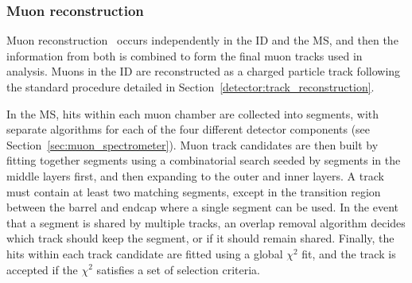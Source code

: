 \subsubsection{Muon reconstruction}\label{detector:muon_reconstruction}
Muon reconstruction~\cite{2014.muon-reconstruction-run1, 2016.muon-reconstruction-13tev} occurs independently in the ID and the MS, and then the information from both is combined to form the final muon tracks used in analysis.
Muons in the ID are reconstructed as a charged particle track following the standard procedure detailed in Section~\ref{detector:track_reconstruction}.

In the MS, hits within each muon chamber are collected into segments, with separate algorithms for each of the four different detector components (see Section~\ref{sec:muon_spectrometer}).
Muon track candidates are then built by fitting together segments using a combinatorial search seeded by segments in the middle layers first, and then expanding to the outer and inner layers.
A track must contain at least two matching segments, except in the transition region between the barrel and endcap where a single segment can be used.
In the event that a segment is shared by multiple tracks, an overlap removal algorithm decides which track should keep the segment, or if it should remain shared.
Finally, the hits within each track candidate are fitted using a global $\chi^2$ fit, and the track is accepted if the $\chi^2$ satisfies a set of selection criteria.

